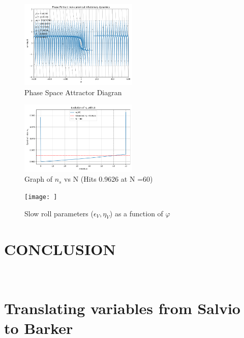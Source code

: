 \documentclass[aps,prd,reprint,preprintnumbers,showpacs,floatfix,nofootinbib,superscript address]{revtex4-2}
\begin{document}
\begin{figure}[h!]
    \centering
    \includegraphics[width=0.5\textwidth]{Python/Figures/Phase Space 1.png}
    \caption{Phase Space Attractor Diagran}
    \label{Phase Space}
\end{figure}

\begin{figure}[h!]
    \centering
    \includegraphics[width=0.5\textwidth]{Python/Figures/FINALLY NS.png}
    \caption{Graph of $n_s$ vs N (Hits 0.9626 at N =60)}
    \label{n_s}
\end{figure}

\begin{figure}[h!]
    \centering
    \texttt{[image: ]}
    \caption{Slow roll parameters ($\epsilon_V , \eta_V$) as a function of $\varphi$}
    \label{Slow Roll Parameters}
\end{figure}

\section{CONCLUSION}

\newpage
$\,$

\newpage

\appendix

\section{Translating variables from Salvio to Barker} \label{Appendix A}
\end{document}
